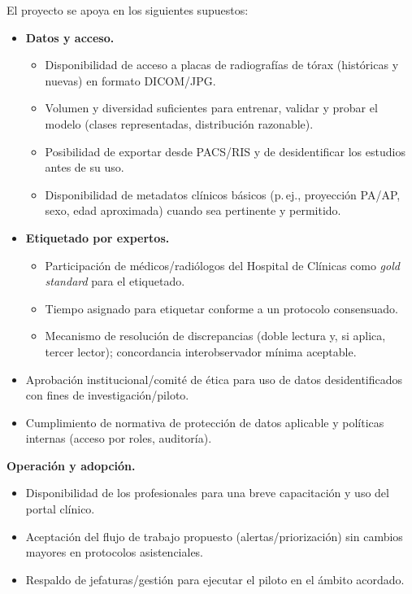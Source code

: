 \documentclass[
11pt, %
]{charter}
\begin{document}
El proyecto se apoya en los siguientes supuestos:
\begin{itemize}
  \item \textbf{Datos y acceso.}
    \begin{itemize}
      \item Disponibilidad de acceso a placas de radiografías de tórax (históricas y nuevas) en formato DICOM/JPG.
      \item Volumen y diversidad suficientes para entrenar, validar y probar el modelo (clases representadas, distribución razonable).
      \item Posibilidad de exportar desde PACS/RIS y de desidentificar los estudios antes de su uso.
      \item Disponibilidad de metadatos clínicos básicos (p.\,ej., proyección PA/AP, sexo, edad aproximada) cuando sea pertinente y permitido.
    \end{itemize}

    \pagebreak
    
  \item \textbf{Etiquetado por expertos.}
    \begin{itemize}
      \item Participación de médicos/radiólogos del Hospital de Clínicas como \emph{gold standard} para el etiquetado.
      \item Tiempo asignado para etiquetar conforme a un protocolo consensuado.
      \item Mecanismo de resolución de discrepancias (doble lectura y, si aplica, tercer lector); concordancia interobservador mínima aceptable.
    \end{itemize}  
      \item Aprobación institucional/comité de ética para uso de datos desidentificados con fines de investigación/piloto.
      \item Cumplimiento de normativa de protección de datos aplicable y políticas internas (acceso por roles, auditoría).
    \end{itemize}
  \item \textbf{Operación y adopción.}
    \begin{itemize}
      \item Disponibilidad de los profesionales para una breve capacitación y uso del portal clínico.
      \item Aceptación del flujo de trabajo propuesto (alertas/priorización) sin cambios mayores en protocolos asistenciales.
      \item Respaldo de jefaturas/gestión para ejecutar el piloto en el ámbito acordado.
    \end{itemize}
  
\end{document}

